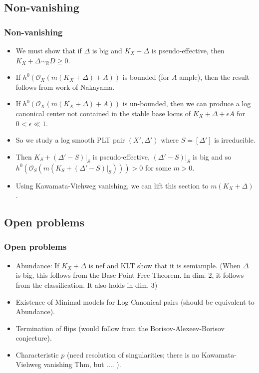 \documentclass{beamer}
\theoremstyle{plain}
\theoremstyle{definition}
\theoremstyle{remark}
\def\OO{\mathcal {O}}
\begin{document}
\subsection{Non-vanishing}
\begin{frame}
\frametitle{Non-vanishing}
\begin{itemize} 
\item We must show that if $\Delta$ is big and $K_X+\Delta$ is 
pseudo-effective, then $K_X+\Delta \sim _{\mathbb {R}}D\geq 0$.
\pause
\item If $h^0(\OO _X(m(K_X+\Delta)+A))$ is bounded (for $A$ ample),
then the result follows from work of Nakayama.
\pause
\item If $h^0(\OO _X(m(K_X+\Delta)+A))$ is un-bounded, then we can produce a
log canonical center not contained in the stable base locus of
$K_X+\Delta+\epsilon A$ for $0<\epsilon \ll 1$.
\pause
\item So we study a log smooth PLT pair $(X',\Delta ')$ where $S=[\Delta ']$
is irreducible.
\pause
\item Then $K_S+(\Delta '-S)|_S$ is pseudo-effective, $(\Delta '-S)|_S$ is 
big and so $h^0(\OO _S(m(K_S+(\Delta '-S)|_S)))>0$ for some $m>0$.
\pause
\item Using Kawamata-Viehweg vanishing, we can lift this section to $m(K_X+\Delta)$.
\end{itemize}

\end{frame}
\subsection{Open problems}
\begin{frame}
\frametitle{Open problems}
\begin{itemize}
\item Abundance: If $K_X+\Delta$ is nef and KLT show that it is semiample.
(When $\Delta$ is big, this follows from the Base Point Free Theorem.
In dim. 2, it follows from the classification. It also holds in dim. 3)
\pause
\item Existence of Minimal models for Log Canonical pairs (should be equivalent to Abundance).
\pause
\item Termination of flips (would follow from the Borisov-Alexeev-Borisov
conjecture).
\pause
\item Characteristic $p$ (need resolution of singularities; there is no Kawamata-Viehweg vanishing Thm, but .... ).
\end{itemize}
\end{frame}
\end{document}
